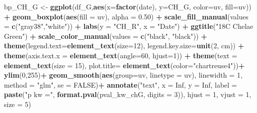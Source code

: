 \documentclass[
]{article}
\newenvironment{Shaded}{\begin{snugshade}}{\end{snugshade}}
\newcommand{\AttributeTok}[1]{\textcolor[rgb]{0.13,0.29,0.53}{#1}}
\newcommand{\ConstantTok}[1]{\textcolor[rgb]{0.56,0.35,0.01}{#1}}
\newcommand{\DecValTok}[1]{\textcolor[rgb]{0.00,0.00,0.81}{#1}}
\newcommand{\FloatTok}[1]{\textcolor[rgb]{0.00,0.00,0.81}{#1}}
\newcommand{\FunctionTok}[1]{\textcolor[rgb]{0.13,0.29,0.53}{\textbf{#1}}}
\newcommand{\NormalTok}[1]{#1}
\newcommand{\OtherTok}[1]{\textcolor[rgb]{0.56,0.35,0.01}{#1}}
\newcommand{\SpecialCharTok}[1]{\textcolor[rgb]{0.81,0.36,0.00}{\textbf{#1}}}
\newcommand{\StringTok}[1]{\textcolor[rgb]{0.31,0.60,0.02}{#1}}
\begin{document}
\begin{Shaded}
\begin{Highlighting}[]
\NormalTok{bp\_CH\_G }\OtherTok{\textless{}{-}} \FunctionTok{ggplot}\NormalTok{(df\_G,}\FunctionTok{aes}\NormalTok{(}\AttributeTok{x=}\FunctionTok{factor}\NormalTok{(date), }\AttributeTok{y=}\NormalTok{CH\_G, }\AttributeTok{color=}\NormalTok{uv, }\AttributeTok{fill=}\NormalTok{uv)) }\SpecialCharTok{+}
  \FunctionTok{geom\_boxplot}\NormalTok{(}\FunctionTok{aes}\NormalTok{(}\AttributeTok{fill =}\NormalTok{ uv), }\AttributeTok{alpha =} \FloatTok{0.50}\NormalTok{) }\SpecialCharTok{+} 
  \FunctionTok{scale\_fill\_manual}\NormalTok{(}\AttributeTok{values =} \FunctionTok{c}\NormalTok{(}\StringTok{"gray38"}\NormalTok{,}\StringTok{"white"}\NormalTok{)) }\SpecialCharTok{+} 
  \FunctionTok{labs}\NormalTok{(}\AttributeTok{y =} \StringTok{"CH\_R"}\NormalTok{, }\AttributeTok{x =} \StringTok{"Date"}\NormalTok{) }\SpecialCharTok{+} \FunctionTok{ggtitle}\NormalTok{(}\StringTok{"18C Chelae Green"}\NormalTok{) }\SpecialCharTok{+} 
  \FunctionTok{scale\_color\_manual}\NormalTok{(}\AttributeTok{values =} \FunctionTok{c}\NormalTok{(}\StringTok{"black"}\NormalTok{, }\StringTok{"black"}\NormalTok{)) }\SpecialCharTok{+} 
  \FunctionTok{theme}\NormalTok{(}\AttributeTok{legend.text=}\FunctionTok{element\_text}\NormalTok{(}\AttributeTok{size=}\DecValTok{12}\NormalTok{), }\AttributeTok{legend.key.size=}\FunctionTok{unit}\NormalTok{(}\DecValTok{2}\NormalTok{, }\StringTok{\textquotesingle{}cm\textquotesingle{}}\NormalTok{)) }\SpecialCharTok{+}
  \FunctionTok{theme}\NormalTok{(}\AttributeTok{axis.text.x =} \FunctionTok{element\_text}\NormalTok{(}\AttributeTok{angle=}\DecValTok{60}\NormalTok{, }\AttributeTok{hjust=}\DecValTok{1}\NormalTok{)) }\SpecialCharTok{+}
  \FunctionTok{theme}\NormalTok{(}\AttributeTok{text =} \FunctionTok{element\_text}\NormalTok{(}\AttributeTok{size =} \DecValTok{15}\NormalTok{), }\AttributeTok{plot.title=} \FunctionTok{element\_text}\NormalTok{(}\AttributeTok{color=}\StringTok{"chartreuse4"}\NormalTok{))}\SpecialCharTok{+}
  \FunctionTok{ylim}\NormalTok{(}\DecValTok{0}\NormalTok{,}\DecValTok{255}\NormalTok{)}\SpecialCharTok{+}
  \FunctionTok{geom\_smooth}\NormalTok{(}\FunctionTok{aes}\NormalTok{(}\AttributeTok{group=}\NormalTok{uv, }\AttributeTok{linetype =}\NormalTok{ uv), }\AttributeTok{linewidth =} \DecValTok{1}\NormalTok{, }\AttributeTok{method =} \StringTok{"glm"}\NormalTok{, }\AttributeTok{se =} \ConstantTok{FALSE}\NormalTok{)}\SpecialCharTok{+}
  \FunctionTok{annotate}\NormalTok{(}\StringTok{"text"}\NormalTok{, }\AttributeTok{x =} \ConstantTok{Inf}\NormalTok{, }\AttributeTok{y =} \ConstantTok{Inf}\NormalTok{, }
           \AttributeTok{label =} \FunctionTok{paste}\NormalTok{(}\StringTok{"p kw ="}\NormalTok{, }\FunctionTok{format.pval}\NormalTok{(pval\_kw\_chG, }\AttributeTok{digits =} \DecValTok{3}\NormalTok{)),}
           \AttributeTok{hjust =} \DecValTok{1}\NormalTok{, }\AttributeTok{vjust =} \DecValTok{1}\NormalTok{, }\AttributeTok{size =} \DecValTok{5}\NormalTok{)}


\end{Highlighting}
\end{Shaded}
\end{document}
